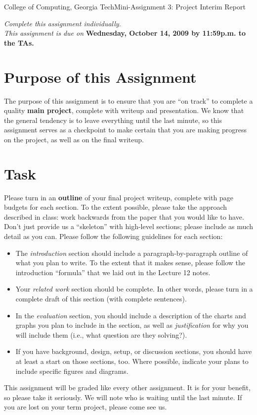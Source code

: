 \documentclass[11pt]{article}
\begin{document}


{College of Computing, Georgia Tech}{Mini-Assignment 3: Project
  Interim Report} 

{\em Complete this assignment individually. \\  This
  assignment is due on} {\bf Wednesday, October 14, 2009 by 11:59p.m. to
  the TAs.}

\section{Purpose of this Assignment}

The purpose of this assignment is to ensure that you are ``on track'' to
complete a quality {\bf main project}, complete with writeup and
presentation.  We know that the general tendency is to leave everything
until the last minute, so this assignment serves as a checkpoint to make
certain that you are making progress on the project, as well as on the
final writeup.

\section{Task}

Please turn in an {\bf outline} of your final project writeup, complete
with page budgets for each section.  To the extent possible, please take
the approach described in class: work backwards from the paper that you
would like to have.  Don't just provide us a ``skeleton'' with
high-level sections; please include as much detail as you can.  Please
follow the following guidelines for each section:
\begin{itemize}
\itemsep=-1pt
\item The {\em introduction} section should include a
  paragraph-by-paragraph outline of what you plan to write.  To the
  extent that it makes sense, please follow the introduction ``formula''
  that we laid out in the Lecture 12 notes.
\item Your {\em related work} section should be complete.  In other
  words, please turn in a complete draft of this section (with complete
  sentences). 
\item In the {\em evaluation} section, you should include a description
  of the charts and graphs you plan to include in the section, as well
  as {\em justification} for why you will include them (i.e., what
  question are they solving?).
\item If you have background, design, setup, or discussion sections, you
  should have at least a start on those sections, too.  Where possible,
  indicate your plans to include specific figures and diagrams.
\end{itemize}
\noindent
This assignment will be graded like every other assignment.  It is for
your benefit, so please take it seriously.  We will note who is waiting
until the last minute.  If you are lost on your term project, please
come see us.
\end{document}
